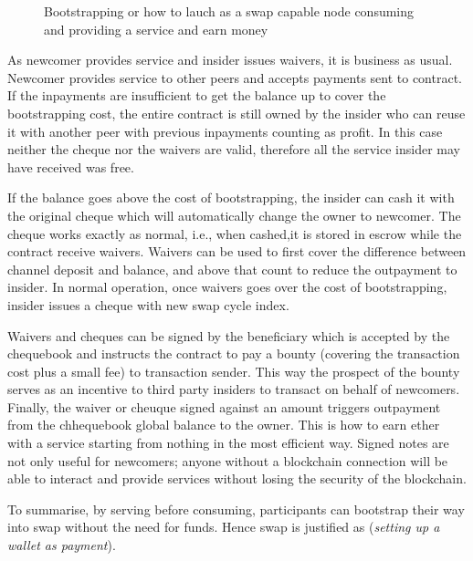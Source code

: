 \documentclass[a4paper,10pt]{article}
\begin{document}
\begin{center}
\begin{figure}
\begin{center}
\end{center}
\caption{Bootstrapping or how to lauch as a swap capable node consuming and providing a
service  and earn money}
\label{fig:bootstrapping}
\end{figure}
\end{center}


As newcomer provides service and insider issues waivers, it is business as usual.
Newcomer provides service to other peers and accepts payments sent to
contract. If the inpayments are insufficient to get the balance up
to cover the bootstrapping cost, the entire contract is still owned by the insider
who can reuse it with another peer with previous inpayments counting as profit.
In this case neither the cheque nor the waivers are valid, therefore all the service insider
may have received was free.

If the balance goes above the cost of bootstrapping, the insider can cash it with
the original cheque which will automatically change the owner to newcomer.
The cheque works exactly as normal, i.e., when cashed,it is stored in escrow
while the contract receive waivers.
Waivers can be used to first cover the difference between channel deposit and balance, and above that
count to reduce the outpayment to insider. In normal operation, once waivers goes over
the cost of bootstrapping, insider issues a cheque with new swap cycle index.


Waivers and cheques can be signed by the beneficiary which is accepted by the chequebook
and instructs the contract to pay a bounty (covering the transaction cost plus a small
fee) to transaction sender. This way the prospect of the bounty serves as an incentive to
third party insiders to transact on behalf of newcomers.
Finally, the waiver or cheuque signed against
an amount triggers outpayment from the chhequebook global  balance to the owner.
This is how to earn ether with a service starting from nothing in the most efficient way.
Signed notes are not only useful for newcomers; anyone without a blockchain connection
will be able to interact and provide services without losing the security of the blockchain.

To summarise, by serving before consuming, participants can
bootstrap their way into swap without the need for funds.
Hence swap is justified as (\emph{setting up a wallet as payment}).
\end{document}
